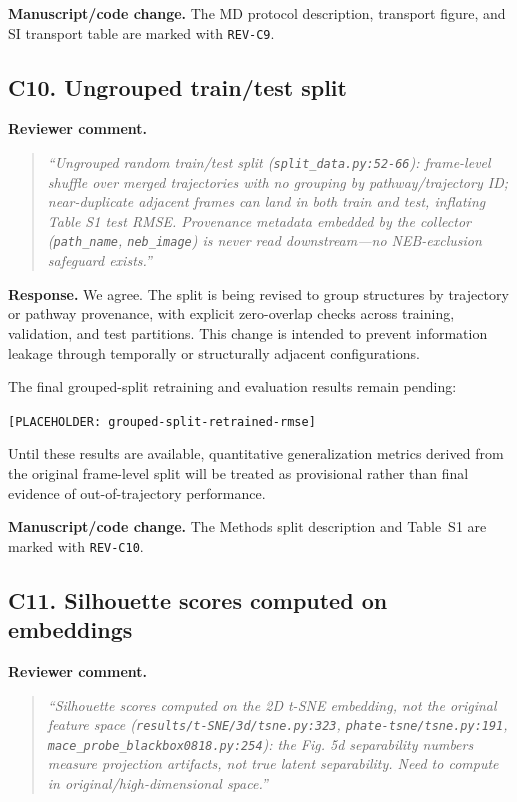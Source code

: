 \documentclass[11pt,a4paper]{article}
\begin{document}
\noindent\textbf{Manuscript/code change.}
The MD protocol description, transport figure, and SI transport table are marked with \texttt{REV-C9}.

\subsection*{C10. Ungrouped train/test split}

\noindent\textbf{Reviewer comment.}
\begin{quote}
\itshape
``Ungrouped random train/test split (\texttt{split\_data.py:52-66}): frame-level shuffle over merged trajectories with no grouping by pathway/trajectory ID; near-duplicate adjacent frames can land in both train and test, inflating Table S1 test RMSE. Provenance metadata embedded by the collector (\texttt{path\_name}, \texttt{neb\_image}) is never read downstream---no NEB-exclusion safeguard exists.''
\end{quote}

\noindent\textbf{Response.}
We agree. The split is being revised to group structures by trajectory or pathway provenance, with explicit zero-overlap checks across training, validation, and test partitions. This change is intended to prevent information leakage through temporally or structurally adjacent configurations.

The final grouped-split retraining and evaluation results remain pending:

\begin{center}
\texttt{[PLACEHOLDER: grouped-split-retrained-rmse]}
\end{center}

Until these results are available, quantitative generalization metrics derived from the original frame-level split will be treated as provisional rather than final evidence of out-of-trajectory performance.

\noindent\textbf{Manuscript/code change.}
The Methods split description and Table~S1 are marked with \texttt{REV-C10}.

\subsection*{C11. Silhouette scores computed on embeddings}

\noindent\textbf{Reviewer comment.}
\begin{quote}
\itshape
``Silhouette scores computed on the 2D t-SNE embedding, not the original feature space (\texttt{results/t-SNE/3d/tsne.py:323}, \texttt{phate-tsne/tsne.py:191}, \texttt{mace\_probe\_blackbox0818.py:254}): the Fig. 5d separability numbers measure projection artifacts, not true latent separability. Need to compute in original/high-dimensional space.''
\end{quote}
\end{document}

